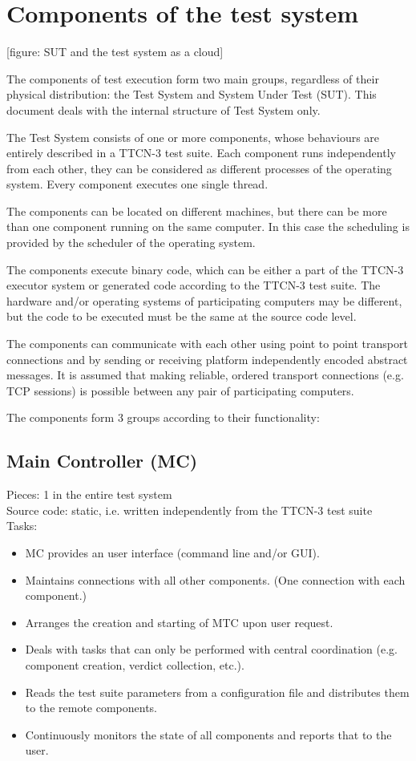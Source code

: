 \documentclass[a4paper,10pt]{article}
\begin{document}
\tableofcontents

\section{Components of the test system}

[figure: SUT and the test system as a cloud]

The components of test execution form two main groups, regardless of their physical distribution: the Test System and System Under Test (SUT). This document deals with the internal structure of Test System only.

The Test System consists of one or more components, whose behaviours are entirely described in a TTCN-3 test suite. Each component runs independently from each other, they can be considered as different processes of the operating system. Every component executes one single thread.

The components can be located on different machines, but there can be more than one component running on the same computer. In this case the scheduling is provided by the scheduler of the operating system.

The components execute binary code, which can be either a part of the TTCN-3 executor system or generated code according to the TTCN-3 test suite. The hardware and/or operating systems of participating computers may be different, but the code to be executed must be the same at the source code level.

The components can communicate with each other using point to point transport connections and by sending or receiving platform independently encoded abstract messages. It is assumed that making reliable, ordered transport connections (e.g. TCP sessions) is possible between any pair of participating computers.

The components form 3 groups according to their functionality:

\subsection{Main Controller (MC)}
Pieces: 1 in the entire test system\\
Source code: static, i.e. written independently from the TTCN-3 test suite \\
Tasks:
\begin{itemize}
\item MC provides an user interface (command line and/or GUI).
\item Maintains connections with all other components. (One connection with each component.)
\item Arranges the creation and starting of MTC upon user request.
\item Deals with tasks that can only be performed with central coordination (e.g. component creation, verdict collection, etc.).
\item Reads the test suite parameters from a configuration file and distributes them to the remote components.
\item Continuously monitors the state of all components and reports that to the user.
\end{itemize}
\end{document}
